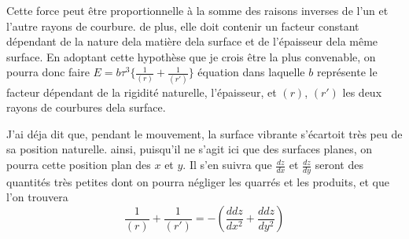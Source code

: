 \documentclass[11pt,a4paper]{article}
\begin{document}
Cette force peut être  proportionnelle à la somme
des raisons inverses de l'un et l'autre rayons de courbure.
de plus, elle doit contenir un facteur constant dépendant de
la nature dela matière dela surface et de l'épaisseur
dela même surface. En adoptant cette hypothèse que
je crois être la plus convenable, on pourra donc  faire
$E = b\tau^3\{\frac{1}{(r)}+\frac{1}{(r')}\}$ équation dans laquelle $b$ représente le
facteur dépendant de la rigidité naturelle, \uncertain{$\tau$} l'épaisseur,
et $(r)$, $(r')$ les deux rayons de courbures dela surface.

J'ai déja dit que, pendant le mouvement, la surface vibrante
s'écartoit très peu  de sa position naturelle.
ainsi, puisqu'il ne s'agit ici que des surfaces planes, on pourra
  cette position    plan des $x$ et $y$. Il s'en suivra
que $\frac{dz}{dx}$ et $\frac{dz}{dy}$ seront des quantités très petites dont on pourra
 négliger les quarrés et les produits, et que l'on trouvera
\[ \frac{1}{(r)}+\frac{1}{(r')} = -\left(\frac{ddz}{dx^2}+\frac{ddz}{dy^2}\right) \]
\end{document}
